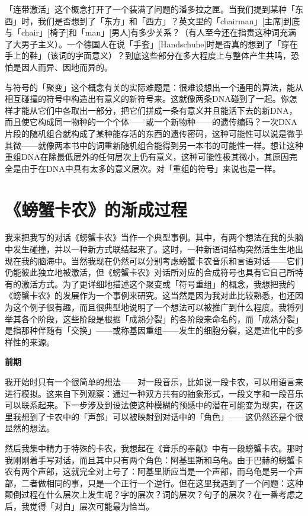 \documentclass[
  12pt,
  twoside,
  openright,
  oldfontcommands,
]{memoir}
\begin{document}
「连带激活」这个概念打开了一个装满了问题的潘多拉之匣。当我们提到某种「东西」时，我们是否想到了「东方」和「西方」？英文里的「chairman」{[}主席{]}到底与「chair」{[}椅子{]}和「man」{[}男人{]}有多少关系？（有人至今还在指责这种词充满了大男子主义）。一个德国人在说「手套」{[}Handschuhe{]}时是否真的想到了「穿在手上的鞋」（该词的字面意义）？到底这些部分在多大程度上与整体产生共鸣，恐怕是因人而异、因地而异的。

与符号的「聚变」这个概念有关的实际难题是：很难设想出一个通用的算法，能从相互碰撞的符号中构造出有意义的新符号来。这就像两条DNA碰到了一起。你怎样才能从它们中各取出一部分，把它们拼成一条有意义并且能活下去的新DNA，而且使它构成同一物种的一个个体------或一个新物种------的遗传编码？一次DNA片段的随机组合就构成了某种能存活的东西的遗传密码，这种可能性可以说是微乎其微------就像两本书中的词重新随机组合能得到另一本书的可能性一样。想让这种重组DNA在除最低层外的任何层次上仍有意义，这种可能性极其微小，其原因完全是由于在DNA中具有太多的意义层次。对「重组的符号」来说也是一样。

\section{《螃蟹卡农》的渐成过程}

我来把我写的对话《螃蟹卡农》当作一个典型事例。其中，有两个想法在我的头脑中发生碰撞，并以一种新方式联结起来了。这时，一种新语词结构突然活生生地出现在我的脑海中。当然我现在仍然可以分别考虑螃蟹卡农音乐和言语对话------它们仍能彼此独立地被激活，但《螃蟹卡农》对话所对应的合成符号也具有它自己所特有的激活方式。为了更详细地描述这个聚变或「符号重组」的概念，我想把我的《螃蟹卡农》的发展作为一个事例来研究。这当然是因为我对此比较熟悉，也还因为这个例子很有趣，而且很典型地说明了一个想法可以被推广到什么程度。我将列举其各个阶段，这些阶段是根据「成熟分裂」的各阶段来命名的，而「成熟分裂」是指那种伴随有「交换」------或称基因重组------发生的细胞分裂，这是进化中的多样性的来源。

\textbf{前期}

我开始时只有一个很简单的想法------对一段音乐，比如说一段卡农，可以用语言来进行模拟。这来自下列观察：通过一种双方共有的抽象形式，一段文字和一段音乐可以联系起来。下一步涉及到设法使这种模糊的预感中的潜在可能变为现实，在这里我想到了卡农中的「声部」可以被映射到对话中的「角色」------这仍然还是个很显然的想法。

然后我集中精力于特殊的卡农，我想起在《音乐的奉献》中有一段螃蟹卡农。那时我刚刚着手写对话，而且其中只有两个角色：阿基里斯和乌龟。由于巴赫的螃蟹卡农有两个声部，这就完全对上号了：阿基里斯应当是一个声部，而乌龟是另一个声部，二者做相同的事，只是一个正行一个逆行。但在这里我遇到了一个问题：这种颠倒过程在什么层次上发生呢？字的层次？词的层次？句子的层次？在一番考虑之后，我觉得「对白」层次可能最为恰当。
\end{document}
